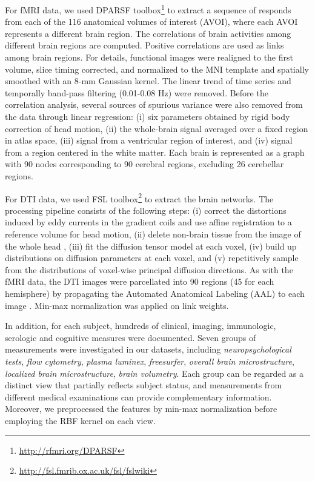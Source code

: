 \documentclass[conference]{IEEEtran}
\newcommand{\neu}[0]{\emph{neuropsychological tests}}
\newcommand{\flo}[0]{\emph{flow cytometry}}
\newcommand{\pla}[0]{\emph{plasma luminex}}
\newcommand{\fre}[0]{\emph{freesurfer}}
\newcommand{\ave}[0]{\emph{overall brain microstructure}}
\newcommand{\dti}[0]{\emph{localized brain microstructure}}
\newcommand{\seg}[0]{\emph{brain volumetry}}
\begin{document}
For fMRI data, we used DPARSF toolbox\footnote{\url{http://rfmri.org/DPARSF}} to extract a sequence of responds from each of the 116 anatomical volumes of interest (AVOI), where each AVOI represents a different brain region. The correlations of brain activities among different brain regions are computed. Positive correlations are used as links among brain regions. For details, functional images were realigned to the first volume, slice timing corrected, and normalized to the MNI template and spatially smoothed with an 8-mm Gaussian kernel. The linear trend of time series and temporally band-pass filtering (0.01-0.08 Hz) were removed. Before the correlation analysis, several sources of spurious variance were also removed from the data through linear regression: (i) six parameters obtained by rigid body correction of head motion, (ii) the whole-brain signal averaged over a fixed region in atlas space, (iii) signal from a ventricular region of interest, and (iv) signal from a region centered in the white matter. Each brain is represented as a graph with 90 nodes corresponding to 90 cerebral regions, excluding 26 cerebellar regions.

For DTI data, we used FSL toolbox\footnote{\url{http://fsl.fmrib.ox.ac.uk/fsl/fslwiki}} to extract the brain networks. The processing pipeline consists of the following steps: (i) correct the distortions induced by eddy currents in the gradient coils and use affine registration to a reference volume for head motion, (ii) delete non-brain tissue from the image of the whole head \cite{smith2002fast,jenkinson2005bet2}, (iii) fit the diffusion tensor model at each voxel, (iv) build up distributions on diffusion parameters at each voxel, and (v) repetitively sample from the distributions of voxel-wise principal diffusion directions. As with the fMRI data, the DTI images were parcellated into 90 regions (45 for each hemisphere) by propagating the Automated Anatomical Labeling (AAL) to each image \cite{tzourio2002automated}. Min-max normalization was applied on link weights.

In addition, for each subject, hundreds of clinical, imaging, immunologic, serologic and cognitive measures were documented. Seven groups of measurements were investigated in our datasets, including {\neu}, {\flo}, {\pla}, {\fre}, {\ave}, {\dti}, {\seg}. Each group can be regarded as a distinct view that partially reflects subject status, and measurements from different medical examinations can provide complementary information. Moreover, we preprocessed the features by min-max normalization before employing the RBF kernel on each view.
\end{document}
